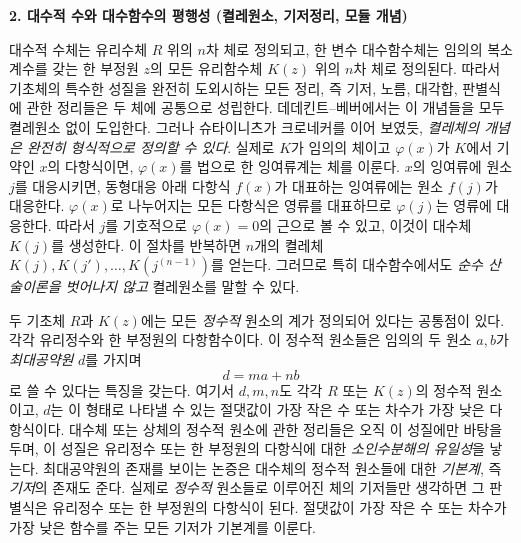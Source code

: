 \begin{center}
\textbf{2. 대수적 수와 대수함수의 평행성\newline
(켤레원소, 기저정리, 모듈 개념)}
\end{center}

대수적 수체는 유리수체 \(R\) 위의 \(n\)차 체로 정의되고, 한 변수 대수함수체는 임의의 복소계수를 갖는 한 부정원 \(z\)의 모든 유리함수체 \(K(z)\) 위의 \(n\)차 체로 정의된다. 따라서 기초체의 특수한 성질을 완전히 도외시하는 모든 정리, 즉 기저, 노름, 대각합, 판별식에 관한 정리들은 두 체에 공통으로 성립한다. 데데킨트--베버에서는 이 개념들을 모두 켤레원소 없이 도입한다. 그러나 슈타이니츠가 크로네커를 이어 보였듯, \emph{켤레체의 개념은 완전히 형식적으로 정의할 수 있다}. 실제로 \(K\)가 임의의 체이고 \(\varphi(x)\)가 \(K\)에서 기약인 \(x\)의 다항식이면, \(\varphi(x)\)를 법으로 한 잉여류계는 체를 이룬다. \(x\)의 잉여류에 원소 \(j\)를 대응시키면, 동형대응 아래 다항식 \(f(x)\)가 대표하는 잉여류에는 원소 \(f(j)\)가 대응한다. \(\varphi(x)\)로 나누어지는 모든 다항식은 영류를 대표하므로 \(\varphi(j)\)는 영류에 대응한다. 따라서 \(j\)를 기호적으로 \(\varphi(x)=0\)의 근으로 볼 수 있고, 이것이 대수체 \(K(j)\)를 생성한다. 이 절차를 반복하면 \(n\)개의 켤레체 \(K(j),K(j'),\ldots,K(j^{(n-1)})\)를 얻는다. 그러므로 특히 대수함수에서도 \emph{순수 산술이론을 벗어나지 않고} 켤레원소를 말할 수 있다.

두 기초체 \(R\)과 \(K(z)\)에는 모든 \emph{정수적} 원소의 계가 정의되어 있다는 공통점이 있다. 각각 유리정수와 한 부정원의 다항함수이다. 이 정수적 원소들은 임의의 두 원소 \(a,b\)가 \emph{최대공약원} \(d\)를 가지며
\[
d=ma+nb
\]
로 쓸 수 있다는 특징을 갖는다. 여기서 \(d,m,n\)도 각각 \(R\) 또는 \(K(z)\)의 정수적 원소이고, \(d\)는 이 형태로 나타낼 수 있는 절댓값이 가장 작은 수 또는 차수가 가장 낮은 다항식이다. 대수체 또는 상체의 정수적 원소에 관한 정리들은 오직 이 성질에만 바탕을 두며, 이 성질은 유리정수 또는 한 부정원의 다항식에 대한 \emph{소인수분해의 유일성}을 낳는다. 최대공약원의 존재를 보이는 논증은 대수체의 정수적 원소들에 대한 \emph{기본계}, 즉 \emph{기저}의 존재도 준다. 실제로 \emph{정수적} 원소들로 이루어진 체의 기저들만 생각하면 그 판별식은 유리정수 또는 한 부정원의 다항식이 된다. 절댓값이 가장 작은 수 또는 차수가 가장 낮은 함수를 주는 모든 기저가 기본계를 이룬다.

